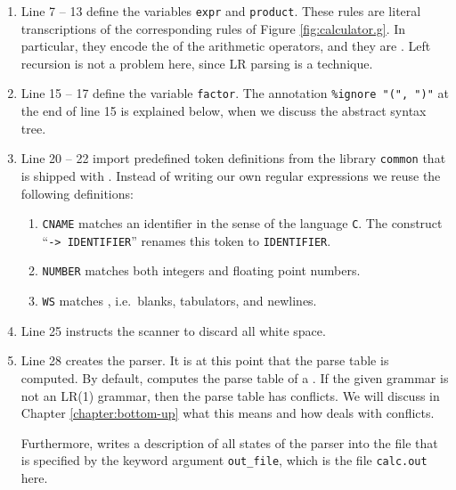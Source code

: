 \begin{enumerate}
      As \texttt{stmnt} is the first syntactical variable of the grammar, it is the .
\item Line 7 -- 13 define the variables \texttt{expr} and \texttt{product}.  These rules are literal
      transcriptions of the corresponding rules of Figure \ref{fig:calculator.g}.  In particular, they
      encode the  of the arithmetic operators, and they are .
      Left recursion is not a problem here, since LR parsing is a  technique.
\item Line 15 -- 17 define the variable \texttt{factor}.  The annotation \texttt{\%ignore "(", ")"} at the end
      of line 15 is explained below, when we discuss the abstract syntax tree.
\item Line 20 -- 22 import predefined token definitions from the library \texttt{common} that is shipped
      with .  Instead of writing our own regular expressions we reuse the following
      definitions:
      \begin{enumerate}
      \item \texttt{CNAME} matches an identifier in the sense of the language \texttt{C}.  The construct
            ``\texttt{-> IDENTIFIER}'' renames this token to \texttt{IDENTIFIER}.
      \item \texttt{NUMBER} matches both integers and floating point numbers.
      \item \texttt{WS} matches , i.e.~blanks, tabulators, and newlines.
      \end{enumerate}
\item Line 25 instructs the scanner to discard all white space.
\item Line 28 creates the parser.  It is at this point that the parse table is computed.
      By default,  computes the parse table of a .  If the given
      grammar is not an LR(1) grammar, then the parse table has conflicts.  We will discuss in Chapter
      \ref{chapter:bottom-up} what this means and how  deals with conflicts.

      Furthermore,  writes a description of all states of the parser into the file that is
      specified by the keyword argument \texttt{out\_file}, which is the file \texttt{calc.out} here.
\end{enumerate}
\FloatBarrier

